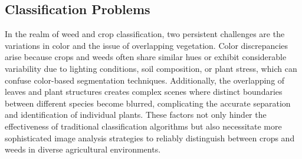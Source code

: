 \documentclass[letterpaper, notitlepage]{report}
\begin{document}
%
%
%

\subsection{Classification Problems}
In the realm of weed and crop classification, two persistent challenges are the variations in color and the issue of overlapping vegetation. Color discrepancies arise because crops and weeds often share similar hues or exhibit considerable variability due to lighting conditions, soil composition, or plant stress, which can confuse color-based segmentation techniques. Additionally, the overlapping of leaves and plant structures creates complex scenes where distinct boundaries between different species become blurred, complicating the accurate separation and identification of individual plants. These factors not only hinder the effectiveness of traditional classification algorithms but also necessitate more sophisticated image analysis strategies to reliably distinguish between crops and weeds in diverse agricultural environments.
\end{document}
